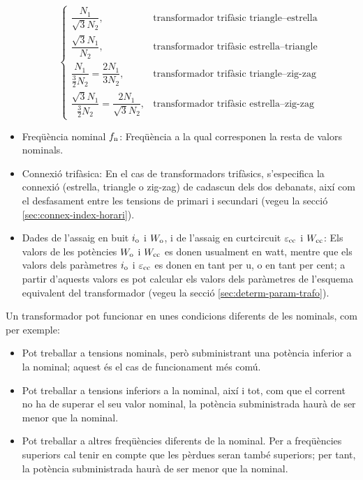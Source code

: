 \begin{itemize}
\begin{equation}
\begin{cases}
        \dfrac{N_1}{\sqrt{3}N_2}, & \text{transformador trifàsic triangle--estrella} \\[0.4cm]
        \dfrac{\sqrt{3}N_1}{N_2}, & \text{transformador trifàsic estrella--triangle} \\[0.4cm]
        \dfrac{N_1}{\frac{3}{2}N_2} = \dfrac{2 N_1}{3 N_2}, & \text{transformador trifàsic triangle--zig-zag} \\[0.4cm]
        \dfrac{\sqrt{3}N_1}{\frac{3}{2}N_2} = \dfrac{2 N_1}{\sqrt{3} N_2}, & \text{transformador trifàsic estrella--zig-zag}
         \end{cases}
       \end{equation}
   \item Freqüència nominal $f_\mathrm{n}$: Freqüència a la qual corresponen la resta de valors nominals.
   \item Connexió trifàsica: En el cas de transformadors trifàsics, s'especifica la connexió (estrella, triangle o zig-zag) de cadascun dels dos debanats, així com el desfasament entre les tensions de primari i secundari (vegeu la secció \vref{sec:connex-index-horari}).
   \item Dades de l'assaig en buit $i_\mathrm{o}$ i $W_\mathrm{o}$, i de l'assaig en curtcircuit $\varepsilon_\mathrm{cc}$ i $W_\mathrm{cc}$: Els valors de les potències $W_\mathrm{o}$ i $W_\mathrm{cc}$ es donen
usualment en watt, mentre que els valors dels paràmetres $i_\mathrm{o}$
i $\varepsilon_\mathrm{cc}$ es donen en tant per u, o en tant per cent; a partir d'aquests valors es pot calcular els valors dels paràmetres de l'esquema equivalent del transformador  (vegeu la secció \vref{sec:determ-param-trafo}).
\end{itemize}

Un transformador pot funcionar en unes condicions diferents de les nominals, com per exemple:
\begin{itemize}
   \item Pot treballar a tensions nominals, però subministrant una potència inferior a la nominal; aquest és el cas de funcionament més comú.
   \item Pot treballar a tensions inferiors a la nominal, així i tot, com que el corrent no ha de superar el seu valor nominal, la potència subministrada haurà de ser menor que la nominal.
   \item Pot treballar a altres freqüències diferents de la nominal. Per a freqüències superiors cal tenir en compte que les pèrdues seran també superiors; per tant, la potència subministrada haurà de ser menor que la nominal.
\end{itemize}

